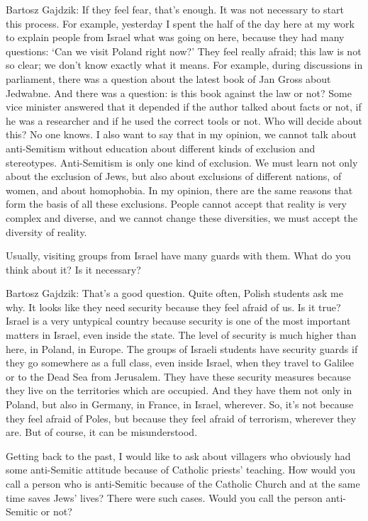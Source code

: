 Bartosz Gajdzik: If they feel fear, that’s enough. It was not necessary to start this process. For example, yesterday I spent the half of the day here at my work to explain people from Israel what was going on here, because they had many questions: ‘Can we visit Poland right now?’ They feel really afraid; this law is not so clear; we don’t know exactly what it means. For example, during discussions in parliament, there was a question about the latest book of Jan Gross about Jedwabne. And there was a question: is this book against the law or not? Some vice minister answered that it depended if the author talked about facts or not, if he was a researcher and if he used the correct tools or not. Who will decide about this? No one knows.  
I also want to say that in my opinion, we cannot talk about anti-Semitism without education about different kinds of exclusion and stereotypes. Anti-Semitism is only one kind of exclusion. We must learn not only about the exclusion of Jews, but also about exclusions of different nations, of women, and about homophobia. In my opinion, there are the same reasons that form the basis of all these exclusions. People cannot accept that reality is very complex and diverse, and we cannot change these diversities, we must accept the diversity of reality.  

Usually, visiting groups from Israel have many guards with them. What do you think about it? Is it necessary? 

Bartosz Gajdzik: That’s a good question. Quite often, Polish students ask me why. It looks like they need security because they feel afraid of us. Is it true? Israel is a very untypical country because security is one of the most important matters in Israel, even inside the state. The level of security is much higher than here, in Poland, in Europe. The groups of Israeli students have security guards if they go somewhere as a full class, even inside Israel, when they travel to Galilee or to the Dead Sea from Jerusalem. They have these security measures because they live on the territories which are occupied. And they have them not only in Poland, but also in Germany, in France, in Israel, wherever. So, it’s not because they feel afraid of Poles, but because they feel afraid of terrorism, wherever they are. But of course, it can be misunderstood.  

Getting back to the past, I would like to ask about villagers who obviously had some anti-Semitic attitude because of Catholic priests’ teaching. How would you call a person who is anti-Semitic because of the Catholic Church and at the same time saves Jews’ lives? There were such cases. Would you call the person anti-Semitic or not? 

